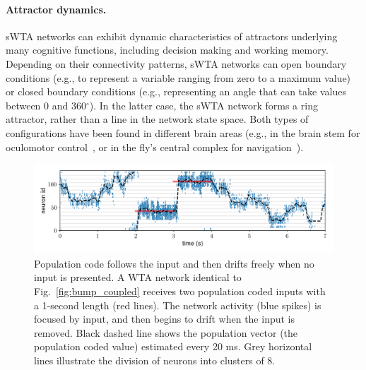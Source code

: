 \paragraph{Attractor dynamics.}

\acs{sWTA} networks can exhibit dynamic characteristics of attractors underlying many cognitive functions, including decision making and working memory. 
Depending on their connectivity patterns, \ac{sWTA} networks can open boundary conditions (e.g., to represent a variable ranging from zero to a maximum value) or closed boundary conditions (e.g., representing an angle that can take values between 0 and 360$^\circ$).
In the latter case, the \ac{sWTA} network forms a ring attractor, rather than a line in the network state space.
Both types of configurations have been found in different brain areas (e.g., in the brain stem for oculomotor control~\cite{Seung98}, or in the fly's central complex for navigation~\cite{Lyu_etal22,Kim_etal19a}).


\begin{figure}[h]
\centering
\includegraphics[width=0.99\linewidth]{img/chapter3/global_inh_drift3_bump_drift.png}
\caption[Population code drift in absence of input.]{Population code follows the input and then drifts freely when no input is presented. A WTA network identical to Fig.~\ref{fig:bump_coupled} receives two population coded inputs with a 1-second length (red lines). The network activity (blue spikes) is focused by input, and then begins to drift when the input is removed. Black dashed line shows the population vector (the population coded value) estimated every 20 ms. Grey horizontal lines illustrate the division of neurons into clusters of 8.}
\label{fig:bump_drift}
\end{figure}



